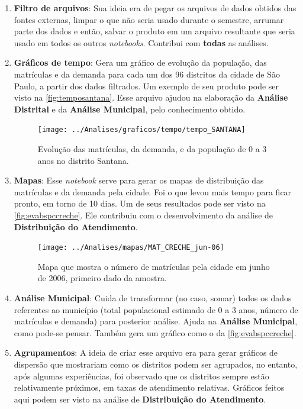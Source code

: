 \documentclass[12pt, a4paper]{article}
\begin{document}
\begin{enumerate}
	\item \textbf{Filtro de arquivos}: Sua ideia era de pegar os arquivos de dados obtidos das fontes externas, limpar o que não seria usado durante o semestre, arrumar parte dos dados e então, salvar o produto em um arquivo resultante que seria usado em todos os outros \textit{notebooks}. Contribui com \textbf{todas} as análises.
	\item \textbf{Gráficos de tempo}: Gera um gráfico de evolução da população, das matrículas e da demanda para cada um dos 96 distritos da cidade de São Paulo, a partir dos dados filtrados. Um exemplo de seu produto pode ser visto na \autoref{fig:temposantana}. Esse arquivo ajudou na elaboração da \textbf{Análise Distrital} e da \textbf{Análise Municipal}, pelo conhecimento obtido.
	\begin{figure}[H]
		\centering
		\texttt{[image: ../Analises/graficos/tempo/tempo\_SANTANA]}
		\caption{Evolução das matrículas, da demanda, e da população de 0 a 3 anos no distrito Santana.}
		\label{fig:temposantana}
	\end{figure}
	\item \textbf{Mapas}: Esse \textit{notebook} serve para gerar os mapas de distribuição das matrículas e da demanda pela cidade. Foi o que levou mais tempo para ficar pronto, em torno de 10 dias. Um de seus resultados pode ser visto na \autoref{fig:evabspccreche}. Ele contribuiu com o desenvolvimento da análise de \textbf{Distribuição do Atendimento}.
	\begin{figure}[H]
		\centering
		\texttt{[image: ../Analises/mapas/MAT\_CRECHE\_jun-06]}
		\caption{Mapa que mostra o número de matrículas pela cidade em junho de 2006, primeiro dado da amostra.}
		\label{fig:evabspccreche}
	\end{figure}
	\item \textbf{Análise Municipal}: Cuida de transformar (no caso, somar) todos os dados referentes ao município (total populacional estimado de 0 a 3 anos, número de matrículas e demanda) para posterior análise. Ajuda na \textbf{Análise Municipal}, como pode-se pensar. Também gera um gráfico como o da \autoref{fig:evabspccreche}.
	\item \textbf{Agrupamentos}: A ideia de criar esse arquivo era para gerar gráficos de dispersão que mostrariam como os distritos podem ser agrupados, no entanto, após algumas experiências, foi observado que os distritos sempre estão relativamente próximos, em taxas de atendimento relativas. Gráficos feitos aqui podem ser visto na análise de \textbf{Distribuição do Atendimento}.

\end{enumerate}
\end{document}
